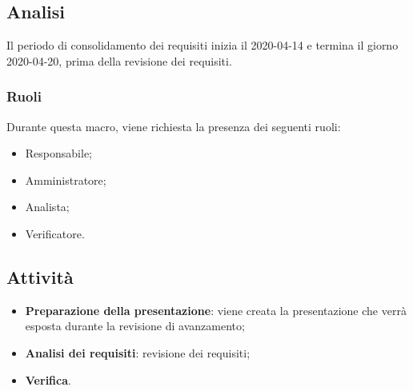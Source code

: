 \documentclass[../piano-di-progetto.tex]{subfiles}
\begin{document}
\subsection{Analisi}
Il periodo di consolidamento dei requisiti inizia il 2020-04-14 e termina il giorno 2020-04-20, prima della revisione dei requisiti. 

\subsubsection{Ruoli}
Durante questa macro, viene richiesta la presenza dei seguenti ruoli:
\begin{itemize}
    \item Responsabile;
    \item Amministratore;
    \item Analista;
    \item Verificatore.
\end{itemize}

\subsection{Attività}
\begin{itemize}
    \item \textbf{Preparazione della presentazione}: viene creata la presentazione che verrà esposta durante la revisione di avanzamento;
    \item \textbf{Analisi dei requisiti}: revisione dei requisiti;
    \item \textbf{Verifica}.
\end{itemize}
\end{document}
